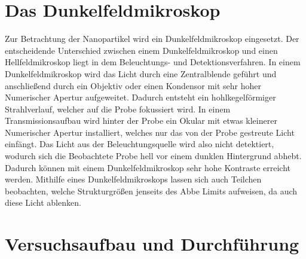 \section{Das Dunkelfeldmikroskop}

Zur Betrachtung der Nanopartikel wird ein Dunkelfeldmikroskop eingesetzt. Der entscheidende Unterschied zwischen einem Dunkelfeldmikroskop und einen Hellfeldmikroskop liegt in dem Beleuchtungs- und Detektionsverfahren. In einem Dunkelfeldmikroskop wird das Licht durch eine Zentralblende geführt und anschließend durch ein Objektiv oder einen Kondensor mit sehr hoher Numerischer Apertur aufgeweitet. Dadurch entsteht ein hohlkegelförmiger Strahlverlauf, welcher auf die Probe fokussiert wird. In einem Transmissionsaufbau wird hinter der Probe ein Okular mit etwas kleinerer Numerischer Apertur installiert, welches nur das von der Probe gestreute Licht einfängt. Das Licht aus der Beleuchtungsquelle wird also nicht detektiert, wodurch sich die Beobachtete Probe hell vor einem dunklen Hintergrund abhebt. Dadurch können mit einem Dunkelfeldmikroskop sehr hohe Kontraste erreicht werden. Mithilfe eines Dunkelfeldmikroskops lassen sich auch Teilchen beobachten, welche Strukturgrößen jenseits des Abbe Limits aufweisen, da auch diese Licht ablenken. \cite{anleitung}\\

\section{Versuchsaufbau und Durchführung}

